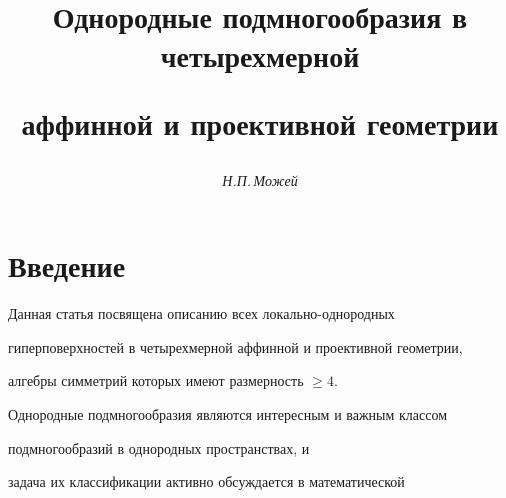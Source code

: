 

\setcounter{page}{41}















\author{\it Н.П.\,Можей}




\title{Однородные подмногообразия в четырехмерной 


аффинной и проективной геометрии}





\date{}




\pagestyle{plain} %







\maketitle


\label{begin}





\section{Введение}





Данная статья посвящена описанию всех локально-однородных


гиперповерхностей в четырехмерной аффинной и проективной геометрии,


алгебры симметрий которых имеют размерность $\ge 4$. 


Однородные подмногообразия являются интересным и важным классом


подмногообразий в однородных пространствах, и 


задача их классификации активно обсуждается в математической


